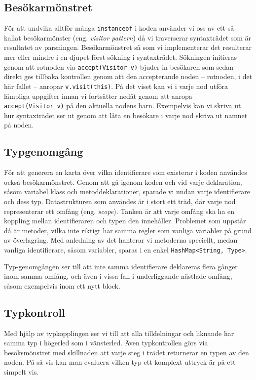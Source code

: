 \documentclass[a4paper,11pt]{article}
\newcommand{\trans}[2][eng.]{(#1 \emph{#2})}
\renewcommand{\*}[0]{\cdot}
\begin{document}
\subsection*{Besökarmönstret}

För att undvika alltför många \texttt{instanceof} i koden använder vi oss av
ett så kallat besökarmönster \trans{visitor pattern} då vi traverserar
syntaxträdet som är resultatet av parsningen. Besökarmönstret så som vi
implementerar det resulterar mer eller mindre i en djupet-först-sökning i
syntaxträdet. Sökningen initieras genom att rotnoden via
\texttt{accept(Visitor~v)} bjuder in besökaren som sedan direkt ges tillbaka
kontrollen genom att den accepterande noden -- rotnoden, i det här fallet --
anropar \texttt{v.visit(this)}. På det viset kan vi i varje nod utföra lämpliga
uppgifter innan vi fortsätter nedåt genom att anropa \texttt{accept(Visitor~v)}
på den aktuella nodens barn. Exempelvis kan vi skriva ut hur syntaxträdet ser
ut genom att låta en besökare i varje nod skriva ut namnet på noden.

\subsection*{Typgenomgång}

För att generera en karta över vilka identifierare som existerar i koden
användes också besökarmönstret. Genom att gå igenom koden och vid varje
deklaration, såsom variabel klass och metoddeklarationer, sparade vi undan
varje identifierare och dess typ. Datastrukturen som användes är i stort ett
träd, där varje nod representerar ett omfång \trans{scope}. Tanken är att varje
omfång ska ha en koppling mellan identifieraren och typen den innehåller.
Problemet som uppstår då är metoder, vilka inte riktigt har samma regler som
vanliga variabler på grund av överlagring. Med anledning av det hanterar vi
metoderna speciellt, medan vanliga identifierare, såsom variabler, sparas i en
enkel \texttt{HashMap<String, Type>}.

Typ-genomgången ser till att inte samma identifierare deklareras flera gånger
inom samma omfång, och även i vissa fall i underliggande nästlade omfång, såsom
exempelvis inom ett nytt block.

\subsection*{Typkontroll}

Med hjälp av typkopplingen ser vi till att alla tilldelningar och liknande har
samma typ i högerled som i vänsterled. Även typkontrollen görs via
besöksmönstret med skillnaden att varje steg i trädet returnerar en typen av
den noden. På så vis kan man evaluera vilken typ ett komplext uttryck är på ett
simpelt vis.
\end{document}
